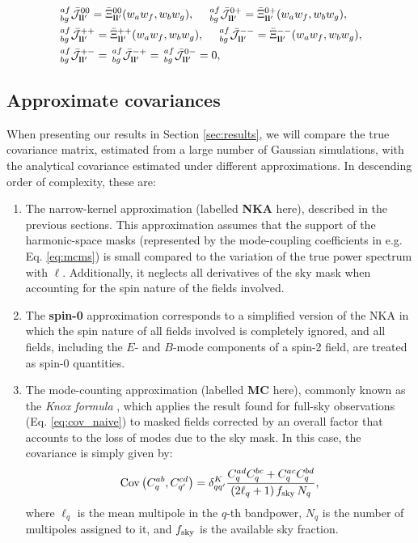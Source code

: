 \documentclass[a4paper,11pt]{article}
\begin{document}
        \begin{align}
          &\,^{af}_{bg}\bar{\mathcal{J}}^{00}_{{\bf l}{\bf l}'}=\bar{\Xi}^{00}_{{\bf l}{\bf l}'}(w_aw_f,w_bw_g),\hspace{12pt}
           \,^{af}_{bg}\bar{\mathcal{J}}^{0+}_{{\bf l}{\bf l}'}=\bar{\Xi}^{0+}_{{\bf l}{\bf l}'}(w_aw_f,w_bw_g),\\
          &\,^{af}_{bg}\bar{\mathcal{J}}^{++}_{{\bf l}{\bf l}'}=\bar{\Xi}^{++}_{{\bf l}{\bf l}'}(w_aw_f,w_bw_g),\hspace{12pt}
           \,^{af}_{bg}\bar{\mathcal{J}}^{--}_{{\bf l}{\bf l}'}=\bar{\Xi}^{--}_{{\bf l}{\bf l}'}(w_aw_f,w_bw_g),\\
          &\,^{af}_{bg}\bar{\mathcal{J}}^{+-}_{{\bf l}{\bf l}'}=
           \,^{af}_{bg}\bar{\mathcal{J}}^{-+}_{{\bf l}{\bf l}'}=
           \,^{af}_{bg}\bar{\mathcal{J}}^{0-}_{{\bf l}{\bf l}'}=0,
        \end{align}
        
    \subsection{Approximate covariances}\label{ssec:theory.approx}
      When presenting our results in Section \ref{sec:results}, we will compare the true covariance matrix, estimated from a large number of Gaussian simulations, with the analytical covariance estimated under different approximations. In descending order of complexity, these are:
      \begin{enumerate}
        \item The narrow-kernel approximation (labelled {\bf NKA} here), described in the previous sections. This approximation assumes that the support of the harmonic-space masks (represented by the mode-coupling coefficients in e.g. Eq. \ref{eq:mcms}) is small compared to the variation of the true power spectrum with $\ell$. Additionally, it neglects all derivatives of the sky mask when accounting for the spin nature of the fields involved.
        \item The {\bf spin-0} approximation corresponds to a simplified version of the NKA in which the spin nature of all fields involved is completely ignored, and all fields, including the $E$- and $B$-mode components of a spin-2 field, are treated as spin-0 quantities.
        \item The mode-counting approximation (labelled {\bf MC} here), commonly known as the {\sl Knox formula} \cite{1995PhRvD..52.4307K}, which applies the result found for full-sky observations (Eq. \ref{eq:cov_naive}) to masked fields corrected by an overall factor that accounts to the loss of modes due to the sky mask. In this case, the covariance is simply given by:
        \begin{equation}\label{eq:cov_naive_bpw}
          {\rm Cov}\left(C^{ab}_q,C^{cd}_{q'}\right)=\delta^K_{qq'}\frac{C^{ad}_qC^{bc}_q+C^{ac}_qC^{bd}_q}{(2\ell_q+1)\,f_{\rm sky}\,N_q},
        \end{equation}
        where $\ell_q$ is the mean multipole in the $q$-th bandpower, $N_q$ is the number of multipoles assigned to it, and $f_{\rm sky}$ is the available sky fraction.
      \end{enumerate}
\end{document}
